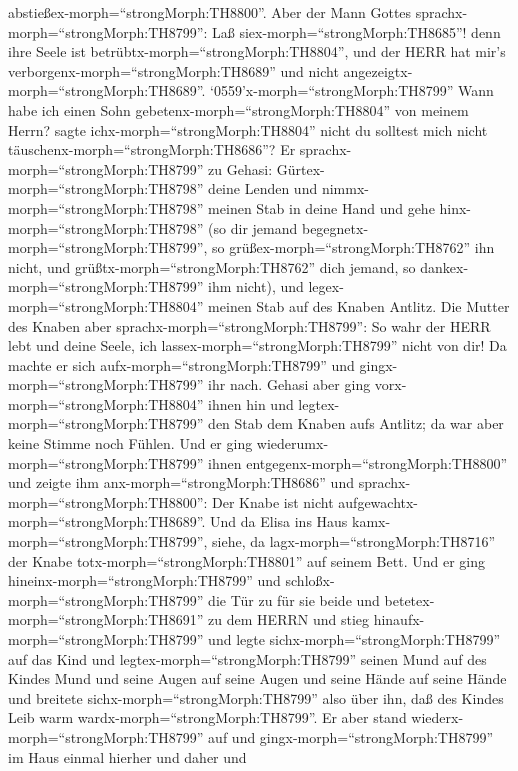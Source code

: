 abstießex-morph=``strongMorph:TH8800''. Aber der Mann Gottes
sprachx-morph=``strongMorph:TH8799'': Laß
siex-morph=``strongMorph:TH8685''! denn ihre Seele ist
betrübtx-morph=``strongMorph:TH8804'', und der HERR hat mir's
verborgenx-morph=``strongMorph:TH8689'' und nicht
angezeigtx-morph=``strongMorph:TH8689''. 
`0559'\textbar x-morph=``strongMorph:TH8799'' Wann habe ich einen Sohn
gebetenx-morph=``strongMorph:TH8804'' von meinem Herrn? sagte
ichx-morph=``strongMorph:TH8804'' nicht du solltest mich nicht
täuschenx-morph=``strongMorph:TH8686''?  Er
sprachx-morph=``strongMorph:TH8799'' zu Gehasi:
Gürtex-morph=``strongMorph:TH8798'' deine Lenden und
nimmx-morph=``strongMorph:TH8798'' meinen Stab in deine Hand und gehe
hinx-morph=``strongMorph:TH8798'' (so dir jemand
begegnetx-morph=``strongMorph:TH8799'', so
grüßex-morph=``strongMorph:TH8762'' ihn nicht, und
grüßtx-morph=``strongMorph:TH8762'' dich jemand, so
dankex-morph=``strongMorph:TH8799'' ihm nicht), und
legex-morph=``strongMorph:TH8804'' meinen Stab auf des Knaben Antlitz.
 Die Mutter des Knaben aber
sprachx-morph=``strongMorph:TH8799'': So wahr der HERR lebt und deine
Seele, ich lassex-morph=``strongMorph:TH8799'' nicht von dir! Da machte
er sich aufx-morph=``strongMorph:TH8799'' und
gingx-morph=``strongMorph:TH8799'' ihr nach.  Gehasi aber
ging vorx-morph=``strongMorph:TH8804'' ihnen hin und
legtex-morph=``strongMorph:TH8799'' den Stab dem Knaben aufs Antlitz; da
war aber keine Stimme noch Fühlen. Und er ging
wiederumx-morph=``strongMorph:TH8799'' ihnen
entgegenx-morph=``strongMorph:TH8800'' und zeigte ihm
anx-morph=``strongMorph:TH8686'' und
sprachx-morph=``strongMorph:TH8800'': Der Knabe ist nicht
aufgewachtx-morph=``strongMorph:TH8689''.  Und da Elisa ins
Haus kamx-morph=``strongMorph:TH8799'', siehe, da
lagx-morph=``strongMorph:TH8716'' der Knabe
totx-morph=``strongMorph:TH8801'' auf seinem Bett.  Und er
ging hineinx-morph=``strongMorph:TH8799'' und
schloßx-morph=``strongMorph:TH8799'' die Tür zu für sie beide und
betetex-morph=``strongMorph:TH8691'' zu dem HERRN  und
stieg hinaufx-morph=``strongMorph:TH8799'' und legte
sichx-morph=``strongMorph:TH8799'' auf das Kind und
legtex-morph=``strongMorph:TH8799'' seinen Mund auf des Kindes Mund und
seine Augen auf seine Augen und seine Hände auf seine Hände und breitete
sichx-morph=``strongMorph:TH8799'' also über ihn, daß des Kindes Leib
warm wardx-morph=``strongMorph:TH8799''.  Er aber stand
wiederx-morph=``strongMorph:TH8799'' auf und
gingx-morph=``strongMorph:TH8799'' im Haus einmal hierher und daher und
